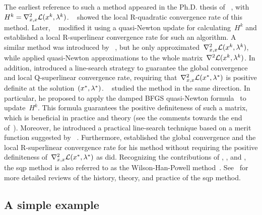 The earliest reference to such a method appeared in the Ph.D. thesis of \citeauthor{Wilson_1963}~\cite{Wilson_1963}, with~$H^k = \nabla_{x, x}^2 \lag(\iter[k], \lm[k])$.
~\cite{Robinson_1974} showed the local R-quadratic convergence rate of this method.
Later, \citeauthor{Garcia-Palomares_Mangasarian_1976}~\cite{Garcia-Palomares_1973,Garcia-Palomares_Mangasarian_1976} modified it using a quasi-Newton update for calculating~$H^k$ and established a local R-superlinear convergence rate for such an algorithm.
A similar method was introduced by \citeauthor{Han_1976}~\cite{Han_1976,Han_1977}, but he only approximated~$\nabla_{x, x}^2 \lag(\iter[k], \lm[k])$, while \citeauthor{Garcia-Palomares_Mangasarian_1976} applied quasi-Newton approximations to the whole matrix~$\nabla^2 \lag(\iter[k], \lm[k])$.
In addition, \citeauthor{Han_1976} introduced a line-search strategy to guarantee the global convergence and local Q-superlinear convergence rate, requiring that~$\nabla_{x, x}^2 \lag(\iter[\ast], \lm[\ast])$ is positive definite at the solution~$(\iter[\ast], \lm[\ast])$.
~\cite{Powell_1978b,Powell_1978a,Powell_1978c} studied the method in the same direction.
In particular, he proposed to apply the damped BFGS quasi-Newton formula~\cite[Eqs.~(5.8),~(5.9), and~(5.10)]{Powell_1978b} to update~$H^k$.
This formula guarantees the positive definiteness of such a matrix, which is beneficial in practice and theory (see the comments towards the end of~\cite[\S~2]{Powell_1978a}).
Moreover, he introduced a practical line-search technique based on a merit function suggested by \citeauthor{Han_1976}~\cite{Han_1976}.
Furthermore, \citeauthor{Powell_1978c} established the global convergence and the local R-superlinear convergence rate for his method without requiring the positive definiteness of~$\nabla_{x, x}^2 \lag(\iter[\ast], \lm[\ast])$ as \citeauthor{Han_1976} did.
Recognizing the contributions of \citeauthor{Wilson_1963}, , and \citeauthor{Powell_1978a}, the \gls{sqp} method is also referred to as the Wilson-Han-Powell method~\cite{Schittkowski_1981,Burke_1992}.
See~\cite{Boggs_Tolle_1995,Gould_Toint_2000,Schittkowski_Yuan_2011,Gill_Wong_2011} for more detailed reviews of the history, theory, and practice of the \gls{sqp} method.

\subsection{A simple example}
\label{subsec:sqp-simple-example}

